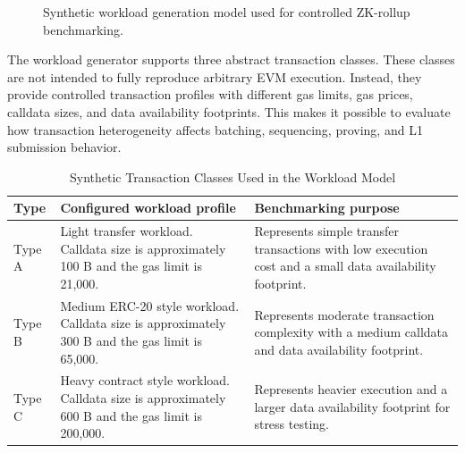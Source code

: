 \begin{figure}[!htbp]
{
}
\caption{Synthetic workload generation model used for controlled ZK-rollup benchmarking.}
\label{fig:workload_generation_model}
\end{figure}



The workload generator supports three abstract transaction classes. These classes are not intended to fully reproduce arbitrary EVM execution. Instead, they provide controlled transaction profiles with different gas limits, gas prices, calldata sizes, and data availability footprints. This makes it possible to evaluate how transaction heterogeneity affects batching, sequencing, proving, and L1 submission behavior.

\begin{table}[!htbp]
\centering
\caption{Synthetic Transaction Classes Used in the Workload Model}
\label{tab:synthetic_transaction_classes}
\scriptsize
\setlength{\tabcolsep}{3pt}
\renewcommand{\arraystretch}{1.20}
\begin{tabularx}{\textwidth}{@{}p{}
>{\RaggedRight\arraybackslash}p{}
>{\RaggedRight\arraybackslash}X@{}}
\toprule
\textbf{Type} & \textbf{Configured workload profile} & \textbf{Benchmarking purpose} \\
\midrule

Type A 
& Light transfer workload. Calldata size is approximately 100 B and the gas limit is 21,000. 
& Represents simple transfer transactions with low execution cost and a small data availability footprint. \\

\addlinespace

Type B 
& Medium ERC-20 style workload. Calldata size is approximately 300 B and the gas limit is 65,000. 
& Represents moderate transaction complexity with a medium calldata and data availability footprint. \\

\addlinespace

Type C 
& Heavy contract style workload. Calldata size is approximately 600 B and the gas limit is 200,000. 
& Represents heavier execution and a larger data availability footprint for stress testing. \\

\bottomrule
\end{tabularx}
\normalsize
\end{table}

